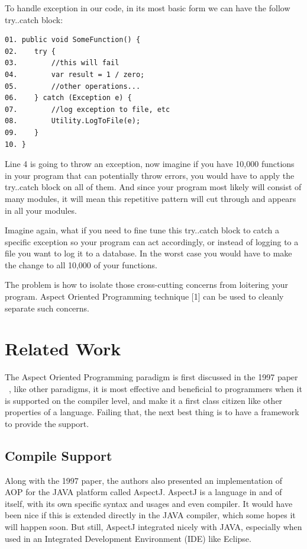 To handle exception in our code, in its most basic form we can have the follow try..catch block:
\begin{verbatim}
01. public void SomeFunction() {
02.    try {
03.        //this will fail
04.        var result = 1 / zero;
05.        //other operations...
06.    } catch (Exception e) {
07.        //log exception to file, etc
08.        Utility.LogToFile(e);
09.    }
10. }
\end{verbatim}

Line 4 is going to throw an exception, now imagine if you have 10,000 functions in your program that can potentially throw errors, you would have to apply the try..catch block on all of them. And since your program most likely will consist of many modules, it will mean this repetitive pattern will cut through and appears in all your modules.

Imagine again, what if you need to fine tune this try..catch block to catch a specific exception so your program can act accordingly, or instead of logging to a file you want to log it to a database. In the worst case you would have to make the change to all 10,000 of your functions.

The problem is how to isolate those cross-cutting concerns from loitering your program. Aspect Oriented Programming technique [1] can be used to cleanly separate such concerns.

\section{Related Work}
The Aspect Oriented Programming paradigm is first discussed in the 1997 paper ~\cite{aop}, like other paradigms, it is most effective and beneficial to programmers when it is supported on the compiler level, and make it a first class citizen like other properties of a language. Failing that, the next best thing is to have a framework to provide the support.

\subsection{Compile Support}

Along with the 1997 paper, the authors also presented an implementation of AOP for the JAVA platform called AspectJ. AspectJ is a language in and of itself, with its own specific syntax and usages and even compiler. It would have been nice if this is extended directly in the JAVA compiler, which some hopes it will happen soon. But still, AspectJ integrated nicely with JAVA, especially when used in an Integrated Development Environment (IDE) like Eclipse.

